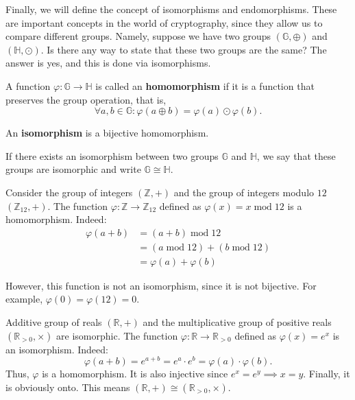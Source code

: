 \documentclass[../lecture-notes.tex]{subfiles}
\begin{document}
Finally, we will define the concept of isomorphisms and endomorphisms. These are important concepts in the world of cryptography, since they allow us to compare different groups. Namely, 
suppose we have two groups $(\mathbb{G},\oplus)$ and $(\mathbb{H}, \odot)$. Is there any way to state that these two groups are the same? The answer is yes, and this is done via isomorphisms.

\begin{definition}
    A function $\varphi: \mathbb{G} \to \mathbb{H}$ is called an \textbf{homomorphism} if it is a function that preserves the group operation, that is, 
    \begin{equation*}
        \forall a,b \in \mathbb{G}: \varphi(a \oplus b) = \varphi(a) \odot \varphi(b).
    \end{equation*}
\end{definition}

\begin{definition}
    An \textbf{isomorphism} is a bijective homomorphism.
\end{definition}

\begin{definition}
    If there exists an isomorphism between two groups $\mathbb{G}$ and $\mathbb{H}$, we say that these groups are isomorphic and write $\mathbb{G} \cong \mathbb{H}$.
\end{definition}

\begin{example}
    Consider the group of integers $(\mathbb{Z},+)$ and the group of integers modulo $12$ $(\mathbb{Z}_{12},+)$. The function $\varphi: \mathbb{Z} \to \mathbb{Z}_{12}$ defined as $\varphi(x) = x \;\text{mod}\; 12$ is a homomorphism. Indeed:
    \begin{align*}
        \varphi(a+b) &= (a+b) \;\text{mod}\; 12 \\
                     &= (a \;\text{mod}\; 12) + (b \;\text{mod}\; 12) \\
                     &= \varphi(a) + \varphi(b)
    \end{align*}

    However, this function is not an isomorphism, since it is not bijective. For example, $\varphi(0) = \varphi(12) = 0$.
\end{example}

\begin{example}
    Additive group of reals $(\mathbb{R}, +)$ and the multiplicative group of positive reals $(\mathbb{R}_{>0}, \times)$ are isomorphic. The function $\varphi: \mathbb{R} \to \mathbb{R}_{>0}$ defined as $\varphi(x) = e^x$ is an isomorphism. Indeed:
    \begin{equation*}
        \varphi(a+b) = e^{a+b} = e^a \cdot e^b = \varphi(a) \cdot \varphi(b).
    \end{equation*}
    Thus, $\varphi$ is a homomorphism. It is also injective since $e^x = e^y \implies x=y$. Finally, it is obviously onto. This means $(\mathbb{R}, +) \cong (\mathbb{R}_{>0}, \times)$.
\end{example}
\end{document}
